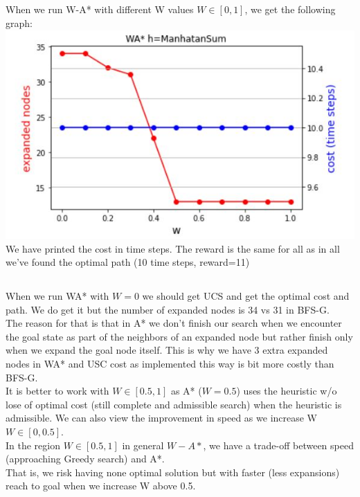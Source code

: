 \documentclass[12pt]{article}
\begin{document}
\subsection{}

When we run W-A* with different W values $W\in[0,1]$, we get the following graph:\\
\includegraphics[scale=1]{w_graph.JPG}\\

We have printed the cost in time steps. The reward is the same for all as in all we've found the optimal path (10 time steps, reward=11)

\subsection{}

When we run WA* with $W=0$ we should get UCS and get the optimal cost and path. We do get it but the number of expanded nodes is 34 vs 31 in BFS-G.\\

The reason for that is that in A* we don't finish our search when we encounter the goal state as part of the neighbors of an expanded node but rather finish only when we expand the goal node itself. This is why we have 3 extra expanded nodes in WA* and USC cost as implemented this way is bit more costly than BFS-G.\\

It is better to work with $W\in[0.5,1]$ as A* ($W=0.5$) uses the heuristic w/o lose of optimal cost (still complete and admissible search) when the heuristic is admissible. We can also view the improvement in speed as we increase W $W\in[0,0.5]$.\\

In the region $W\in[0.5,1]$ in general $W-A*$, we have a trade-off between speed (approaching Greedy search) and A*.\\ That is, we risk having none optimal solution but with faster (less expansions) reach to goal when we increase W above 0.5.\\
\end{document}
